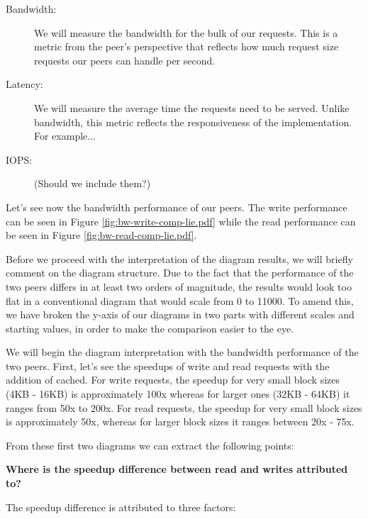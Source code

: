 \begin{description}
	\item[Bandwidth:] We will measure the bandwidth for the bulk of our 
		requests. This is a metric from the peer's perspective that reflects 
		how much request size requests our peers can handle per second.
	\item[Latency:] We will measure the average time the requests need to be 
		served. Unlike bandwidth, this metric reflects the responsiveness of 
		the implementation. For example...
	\item[IOPS:] (Should we include them?)
\end{description}

Let's see now the bandwidth performance of our peers. The write performance can 
be seen in Figure \ref{fig:bw-write-comp-lie.pdf} while the read performance 
can be seen in Figure \ref{fig:bw-read-comp-lie.pdf}.


Before we proceed with the interpretation of the diagram results, we will 
briefly comment on the diagram structure. Due to the fact that the performance 
of the two peers differs in at least two orders of magnitude, the results would 
look too flat in a conventional diagram that would scale from 0 to 11000. To 
amend this, we have broken the y-axis of our diagrams in two parts with 
different scales and starting values, in order to make the comparison easier to 
the eye.

We will begin the diagram interpretation with the bandwidth performance of the 
two peers. First, let's see the speedups of write and read requests with the 
addition of cached. For write requests, the speedup for very small block sizes 
(4KB - 16KB) is approximately 100x whereas for larger ones (32KB - 64KB) it 
ranges from 50x to 200x. For read requests, the speedup for very small block 
sizes is approximately 50x, whereas for larger block sizes it ranges between 
20x - 75x.

From these first two diagrams we can extract the following points:

\textbf{Where is the speedup difference between read and writes attributed to?}

The speedup difference is attributed to three factors:

